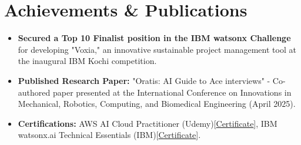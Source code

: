\documentclass[letterpaper,10pt]{article}
\newcommand{\resumeItem}[1]{\item\small{#1\vspace{-2pt}}}
\newcommand{\resumeSubHeadingListStart}{\begin{itemize}[leftmargin=0.15in, label={}]}
\newcommand{\resumeSubHeadingListEnd}{\end{itemize}}
\begin{document}
\section{Achievements \& Publications}
\resumeSubHeadingListStart
    \resumeItem{\textbf{Secured a Top 10 Finalist position in the IBM watsonx Challenge} for developing "Voxia," an innovative sustainable project management tool at the inaugural IBM Kochi competition.}
    \resumeItem{\textbf{Published Research Paper:} "Oratis: AI Guide to Ace interviews" - Co-authored paper presented at the International Conference on Innovations in Mechanical, Robotics, Computing, and Biomedical Engineering (April 2025).}
    \resumeItem{\textbf{Certifications:} AWS AI Cloud Practitioner (Udemy)[\href{https://drive.google.com/file/d/1hyq1dbVjAA1MLuaTsM54wPWLVKikRFmg/view?usp=sharing}{Certificate}], IBM watsonx.ai Technical Essentials (IBM)[\href{https://drive.google.com/file/d/1jE_tHyAmTK9e3APr32Q-aovg3wDvVlDL/view?usp=sharing}{Certificate}].}
\resumeSubHeadingListEnd
\end{document}
